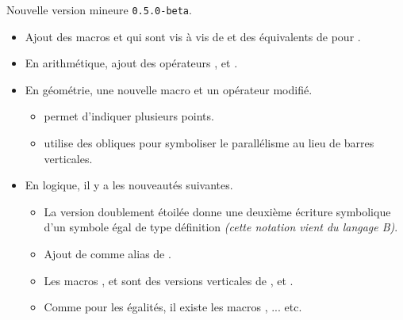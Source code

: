 Nouvelle version mineure \verb+0.5.0-beta+.

\begin{itemize}[itemsep=.5em]
    \item Ajout des macros  et  qui sont vis à vis de  et  des équivalents de  pour .


    \item En arithmétique, ajout des opérateurs ,  et .


    \item En géométrie, une nouvelle macro et un opérateur modifié.
    \begin{itemize}[itemsep=.5em]
        \item {} permet d'indiquer plusieurs points.

        \item {} utilise des obliques pour symboliser le parallélisme au lieu de barres verticales.
    \end{itemize}


    \item En logique, il y a les nouveautés suivantes.
    \begin{itemize}[itemsep=.5em]
        \item La version doublement étoilée  donne une deuxième écriture symbolique d'un symbole égal de type définition \emph{(cette notation vient du langage B)}.

        \item Ajout de  comme alias de .

        \item Les macros ,  et  sont des versions verticales de ,  et .

        \item Comme pour les égalités, il existe les macros ,  ... etc.
    \end{itemize}
\end{itemize}
